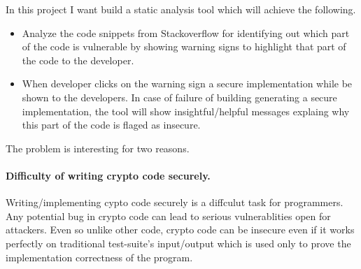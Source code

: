    \label{into}
   In this project I want build a static analysis tool which will achieve the following. 
   \begin{itemize}
   \item  Analyze the code snippets from Stackoverflow for identifying out which part of the code is vulnerable by showing warning signs to highlight that part of the code to the developer.
   \item When developer clicks on the warning sign a secure implementation while be shown to the developers. In case of failure of building generating a secure implementation, the tool will show insightful/helpful messages explaing why this part of the code is flaged as insecure.  
   \end{itemize}
   
   The problem is interesting for two reasons. 
   
   \paragraph{Difficulty of writing crypto code securely.} Writing/implementing cypto code securely is a diffculut task for programmers. Any potential bug in crypto code can lead to serious vulnerablities open for attackers.
   Even so unlike other code, crypto code can be insecure even if it works 
   perfectly on traditional test-suite's input/output which is used only to prove the implementation correctness of the program.
   
